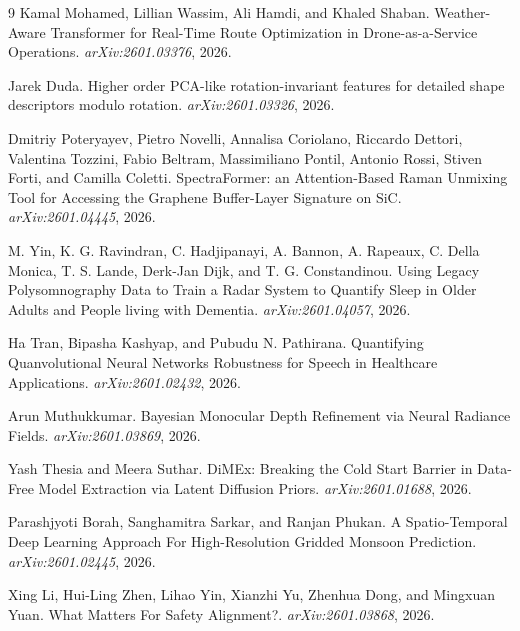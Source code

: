 \documentclass[11pt]{article}
\begin{document}
\begin{thebibliography}{9}
Kamal Mohamed, Lillian Wassim, Ali Hamdi, and Khaled Shaban. Weather-Aware Transformer for Real-Time Route Optimization in Drone-as-a-Service Operations. \emph{arXiv:2601.03376}, 2026.

Jarek Duda. Higher order PCA-like rotation-invariant features for detailed shape descriptors modulo rotation. \emph{arXiv:2601.03326}, 2026.

Dmitriy Poteryayev, Pietro Novelli, Annalisa Coriolano, Riccardo Dettori, Valentina Tozzini, Fabio Beltram, Massimiliano Pontil, Antonio Rossi, Stiven Forti, and Camilla Coletti. SpectraFormer: an Attention-Based Raman Unmixing Tool for Accessing the Graphene Buffer-Layer Signature on SiC. \emph{arXiv:2601.04445}, 2026.

M. Yin, K. G. Ravindran, C. Hadjipanayi, A. Bannon, A. Rapeaux, C. Della Monica, T. S. Lande, Derk-Jan Dijk, and T. G. Constandinou. Using Legacy Polysomnography Data to Train a Radar System to Quantify Sleep in Older Adults and People living with Dementia. \emph{arXiv:2601.04057}, 2026.

Ha Tran, Bipasha Kashyap, and Pubudu N. Pathirana. Quantifying Quanvolutional Neural Networks Robustness for Speech in Healthcare Applications. \emph{arXiv:2601.02432}, 2026.

Arun Muthukkumar. Bayesian Monocular Depth Refinement via Neural Radiance Fields. \emph{arXiv:2601.03869}, 2026.

Yash Thesia and Meera Suthar. DiMEx: Breaking the Cold Start Barrier in Data-Free Model Extraction via Latent Diffusion Priors. \emph{arXiv:2601.01688}, 2026.

Parashjyoti Borah, Sanghamitra Sarkar, and Ranjan Phukan. A Spatio-Temporal Deep Learning Approach For High-Resolution Gridded Monsoon Prediction. \emph{arXiv:2601.02445}, 2026.

Xing Li, Hui-Ling Zhen, Lihao Yin, Xianzhi Yu, Zhenhua Dong, and Mingxuan Yuan. What Matters For Safety Alignment?. \emph{arXiv:2601.03868}, 2026.


\end{thebibliography}
\end{document}
